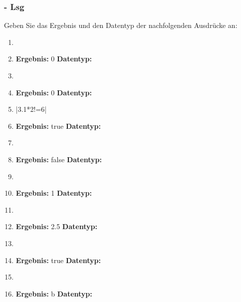 \begin{frame}[t]%
    \frametitle{\stitle - Lsg}
Geben Sie das Ergebnis und den Datentyp der nachfolgenden Ausdrücke an:
\begin{enumerate}
\item {}
\item[] {\bf Ergebnis: } 0 \hfill {\bf Datentyp: } 

\item {}
\item[] {\bf Ergebnis: } 0 \hfill {\bf Datentyp: } 

\item \code|3.1*2!=6|
\item[] {\bf Ergebnis: } true \hfill {\bf Datentyp: } 

\item {}
\item[] {\bf Ergebnis: } false \hfill {\bf Datentyp: } 

\item {}
\item[] {\bf Ergebnis: } 1 \hfill {\bf Datentyp: } 

\item {}
\item[] {\bf Ergebnis: } 2.5 \hfill {\bf Datentyp: } 

\item {}
\item[] {\bf Ergebnis: } true \hfill {\bf Datentyp: } 

\item {}
\item[] {\bf Ergebnis: } b \hfill {\bf Datentyp: } 
\end{enumerate}
\end{frame}
